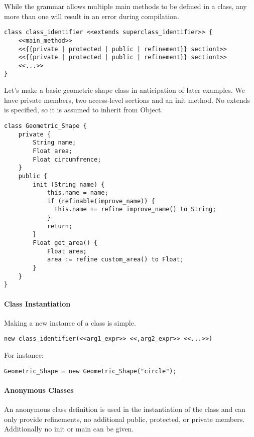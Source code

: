 While the grammar allows multiple main methods to be defined in a class, any more than one will result in an error during compilation.

\begin{lstlisting}
class class_identifier <<extends superclass_identifier>> {
    <<main_method>>
    <<{{private | protected | public | refinement}} section1>>
    <<{{private | protected | public | refinement}} section1>>
    <<...>>
}
\end{lstlisting}

Let's make a basic geometric shape class in anticipation of later examples. We have private members, two access-level sections and an init method. No extends is specified, so it is assumed to inherit from Object.


\begin{lstlisting}[backgroundcolor=\color{tintedorange},label=Method Invocation,caption=Class Declaration for a Geometric Shape class]
class Geometric_Shape {
    private {
        String name;
        Float area;
        Float circumfrence;
    }
    public {
        init (String name) {
            this.name = name;
            if (refinable(improve_name)) {
              this.name += refine improve_name() to String;
            }
            return;
        }
        Float get_area() {
            Float area;
            area := refine custom_area() to Float;
        }
    }
}
\end{lstlisting}

\paragraph{Class Instantiation}
Making a new instance of a class is simple.

\begin{lstlisting}
new class_identifier(<<arg1_expr>> <<,arg2_expr>> <<...>>)
\end{lstlisting}

For instance:

\begin{lstlisting}[backgroundcolor=\color{tintedorange},label=Method Invocation,caption=Class Instantiation for a Geometric Shape class]
Geometric_Shape = new Geometric_Shape("circle");
\end{lstlisting}

\paragraph{Anonymous Classes}
An anonymous class definition is used in the instantiation of the class and can only provide refinements, no additional public, protected, or private members. Additionally no init or main can be given.

